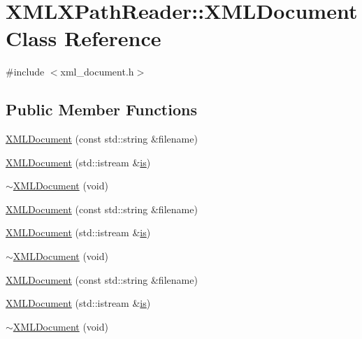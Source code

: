 \hypertarget{classXMLXPathReader_1_1XMLDocument}{}\section{X\+M\+L\+X\+Path\+Reader\+:\+:X\+M\+L\+Document Class Reference}
\label{classXMLXPathReader_1_1XMLDocument}


{\ttfamily \#include $<$xml\+\_\+document.\+h$>$}

\subsection*{Public Member Functions}
\begin{DoxyCompactItemize}
\item 
\mbox{\hyperlink{classXMLXPathReader_1_1XMLDocument_aa7385c1ff92fb49af6fee17de7e6a7d3}{X\+M\+L\+Document}} (const std\+::string \&filename)
\item 
\mbox{\hyperlink{classXMLXPathReader_1_1XMLDocument_aea901941e2389a6c2b0d2d52686f6a99}{X\+M\+L\+Document}} (std\+::istream \&\mbox{\hyperlink{x_8cc_a81abbbdef81e25584a2eab888e643d3d}{is}})
\item 
\mbox{\hyperlink{classXMLXPathReader_1_1XMLDocument_a118c246b3d6018c9d725fdfbafafe46f}{$\sim$\+X\+M\+L\+Document}} (void)
\item 
\mbox{\hyperlink{classXMLXPathReader_1_1XMLDocument_aa7385c1ff92fb49af6fee17de7e6a7d3}{X\+M\+L\+Document}} (const std\+::string \&filename)
\item 
\mbox{\hyperlink{classXMLXPathReader_1_1XMLDocument_aea901941e2389a6c2b0d2d52686f6a99}{X\+M\+L\+Document}} (std\+::istream \&\mbox{\hyperlink{x_8cc_a81abbbdef81e25584a2eab888e643d3d}{is}})
\item 
\mbox{\hyperlink{classXMLXPathReader_1_1XMLDocument_a118c246b3d6018c9d725fdfbafafe46f}{$\sim$\+X\+M\+L\+Document}} (void)
\item 
\mbox{\hyperlink{classXMLXPathReader_1_1XMLDocument_aa7385c1ff92fb49af6fee17de7e6a7d3}{X\+M\+L\+Document}} (const std\+::string \&filename)
\item 
\mbox{\hyperlink{classXMLXPathReader_1_1XMLDocument_aea901941e2389a6c2b0d2d52686f6a99}{X\+M\+L\+Document}} (std\+::istream \&\mbox{\hyperlink{x_8cc_a81abbbdef81e25584a2eab888e643d3d}{is}})
\item 
\mbox{\hyperlink{classXMLXPathReader_1_1XMLDocument_a118c246b3d6018c9d725fdfbafafe46f}{$\sim$\+X\+M\+L\+Document}} (void)
\end{DoxyCompactItemize}
